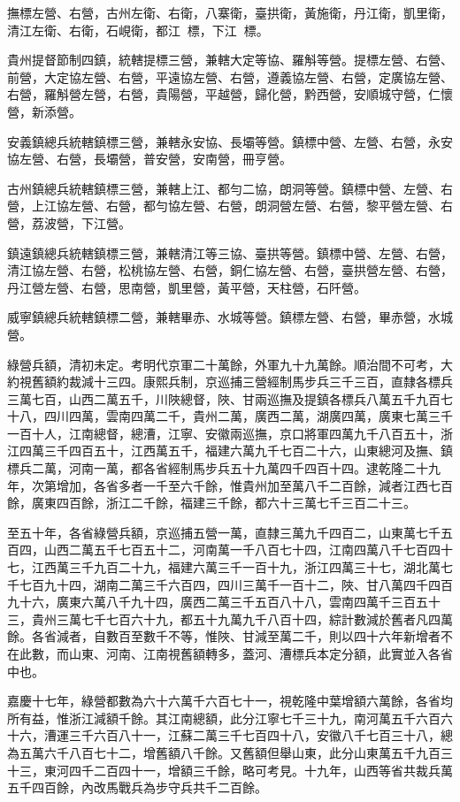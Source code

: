\begin{pinyinscope}
撫標左營、右營，古州左衛、右衛，八寨衛，臺拱衛，黃施衛，丹江衛，凱里衛，清江左衛、右衛，石峴衛，都江標，下江標。

貴州提督節制四鎮，統轄提標三營，兼轄大定等協、羅斛等營。提標左營、右營、前營，大定協左營、右營，平遠協左營、右營，遵義協左營、右營，定廣協左營、右營，羅斛營左營，右營，貴陽營，平越營，歸化營，黔西營，安順城守營，仁懷營，新添營。

安義鎮總兵統轄鎮標三營，兼轄永安協、長壩等營。鎮標中營、左營、右營，永安協左營、右營，長壩營，普安營，安南營，冊亨營。

古州鎮總兵統轄鎮標三營，兼轄上江、都勻二協，朗洞等營。鎮標中營、左營、右營，上江協左營、右營，都勻協左營、右營，朗洞營左營、右營，黎平營左營、右營，荔波營，下江營。

鎮遠鎮總兵統轄鎮標三營，兼轄清江等三協、臺拱等營。鎮標中營、左營、右營，清江協左營、右營，松桃協左營、右營，銅仁協左營、右營，臺拱營左營、右營，丹江營左營、右營，思南營，凱里營，黃平營，天柱營，石阡營。

威寧鎮總兵統轄鎮標二營，兼轄畢赤、水城等營。鎮標左營、右營，畢赤營，水城營。

綠營兵額，清初未定。考明代京軍二十萬餘，外軍九十九萬餘。順治間不可考，大約視舊額約裁減十三四。康熙兵制，京巡捕三營經制馬步兵三千三百，直隸各標兵三萬七百，山西二萬五千，川陜總督，陜、甘兩巡撫及提鎮各標兵八萬五千九百七十八，四川四萬，雲南四萬二千，貴州二萬，廣西二萬，湖廣四萬，廣東七萬三千一百十人，江南總督，總漕，江寧、安徽兩巡撫，京口將軍四萬九千八百五十，浙江四萬三千四百五十，江西萬五千，福建六萬九千七百二十六，山東總河及撫、鎮標兵二萬，河南一萬，都各省經制馬步兵五十九萬四千四百十四。逮乾隆二十九年，次第增加，各省多者一千至六千餘，惟貴州加至萬八千二百餘，減者江西七百餘，廣東四百餘，浙江二千餘，福建三千餘，都六十三萬七千三百二十三。

至五十年，各省綠營兵額，京巡捕五營一萬，直隸三萬九千四百二，山東萬七千五百四，山西二萬五千七百五十二，河南萬一千八百七十四，江南四萬八千七百四十七，江西萬三千九百二十九，福建六萬三千一百十九，浙江四萬三十七，湖北萬七千七百九十四，湖南二萬三千六百四，四川三萬千一百十二，陜、甘八萬四千四百九十六，廣東六萬八千九十四，廣西二萬三千五百八十八，雲南四萬千三百五十三，貴州三萬七千七百六十九，都五十九萬九千八百十四，綜計數減於舊者凡四萬餘。各省減者，自數百至數千不等，惟陜、甘減至萬二千，則以四十六年新增者不在此數，而山東、河南、江南視舊額轉多，蓋河、漕標兵本定分額，此實並入各省中也。

嘉慶十七年，綠營都數為六十六萬千六百七十一，視乾隆中葉增額六萬餘，各省均所有益，惟浙江減額千餘。其江南總額，此分江寧七千三十九，南河萬五千六百六十六，漕運三千六百八十一，江蘇二萬三千七百四十八，安徽八千七百三十八，總為五萬六千八百七十二，增舊額八千餘。又舊額但舉山東，此分山東萬五千九百三十三，東河四千二百四十一，增額三千餘，略可考見。十九年，山西等省共裁兵萬五千四百餘，內改馬戰兵為步守兵共千二百餘。


\end{pinyinscope}
